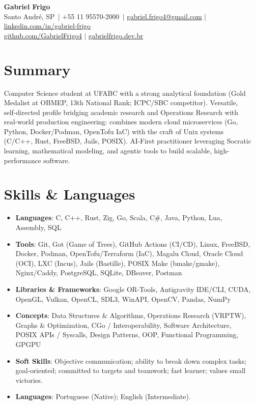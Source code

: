 \documentclass[letterpaper,10pt]{article}
\makeatletter
\newcommand{\resumeItem}[1]{\item\small{#1}}
\newcommand{\resumeSubHeadingList}{\begin{itemize}[leftmargin=0.15in, label={}]}
\newcommand{\resumeSubHeadingListEnd}{\end{itemize}}
\newcommand{\candidateName}{Gabriel Frigo}
\newcommand{\candidateLocation}{Santo André, SP}
\newcommand{\candidatePhone}{+55 11 95570-2000}
\newcommand{\candidateEmail}{gabriel.frigo4@gmail.com}
\newcommand{\candidateLinkedInUser}{gabriel-frigo}
\newcommand{\candidateLinkedInURL}{https://linkedin.com/in/gabriel-frigo-b6727b275/}
\newcommand{\candidateGitHubUser}{GabrielFrigo4}
\newcommand{\candidateGitHubURL}{https://github.com/GabrielFrigo4}
\newcommand{\candidateWebsite}{gabrielfrigo.dev.br}
\newcommand{\candidateWebsiteURL}{https://gabrielfrigo.dev.br}
\makeatother
\begin{document}
\begin{center}
  \textbf{\Huge \candidateName} \\ \vspace{3pt}
  \small \candidateLocation\ $|$ \candidatePhone\ $|$ \href{mailto:\candidateEmail}{\candidateEmail} $|$
  \href{\candidateLinkedInURL}{linkedin.com/in/\candidateLinkedInUser} \\
  \href{\candidateGitHubURL}{github.com/\candidateGitHubUser} $|$
  \href{\candidateWebsiteURL}{\candidateWebsite}
\end{center}

\section{Summary}
Computer Science student at UFABC with a strong analytical foundation (Gold Medalist at OBMEP, 13th National Rank; ICPC/SBC competitor). Versatile, self-directed profile bridging academic research and Operations Research with real-world production engineering: combines modern cloud microservices (Go, Python, Docker/Podman, OpenTofu IaC) with the craft of Unix systems (C/C++, Rust, FreeBSD, Jails, POSIX). AI-First practitioner leveraging Socratic learning, mathematical modeling, and agentic tools to build scalable, high-performance software.

\section{Skills \& Languages}
\resumeSubHeadingList
  \resumeItem{\textbf{Languages}: C, C++, Rust, Zig, Go, Scala, C\#, Java, Python, Lua, Assembly, SQL}
  \resumeItem{\textbf{Tools}: Git, Got (Game of Trees), GitHub Actions (CI/CD), Linux, FreeBSD, Docker, Podman, OpenTofu/Terraform (IaC), Magalu Cloud, Oracle Cloud (OCI), LXC (Incus), Jails (Bastille), POSIX Make (bmake/gmake), Nginx/Caddy, PostgreSQL, SQLite, DBeaver, Postman}
  \resumeItem{\textbf{Libraries \& Frameworks}: Google OR-Tools, Antigravity IDE/CLI, CUDA, OpenGL, Vulkan, OpenCL, SDL3, WinAPI, OpenCV, Pandas, NumPy}
  \resumeItem{\textbf{Concepts}: Data Structures \& Algorithms, Operations Research (VRPTW), Graphs \& Optimization, CGo / Interoperability, Software Architecture, POSIX APIs / Syscalls, Design Patterns, OOP, Functional Programming, GPGPU}
  \resumeItem{\textbf{Soft Skills}: Objective communication; ability to break down complex tasks; goal-oriented; committed to targets and teamwork; fast learner; values small victories.}
  \resumeItem{\textbf{Languages}: Portuguese (Native); English (Intermediate).}
\resumeSubHeadingListEnd
\end{document}
